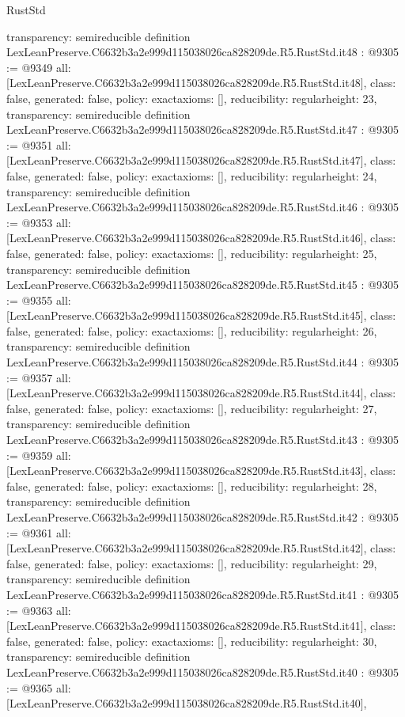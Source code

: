 \begin{lexlean}{RustStd}
\begin{coremodule}
{  transparency: semireducible
}
definition LexLeanPreserve.C6632b3a2e999d115038026ca828209de.R5.RustStd.it48 : @9305 := @9349 {
  all: [LexLeanPreserve.C6632b3a2e999d115038026ca828209de.R5.RustStd.it48],
  class: false,
  generated: false,
  policy: exact{axioms: []},
  reducibility: regular{height: 23},
  transparency: semireducible
}
definition LexLeanPreserve.C6632b3a2e999d115038026ca828209de.R5.RustStd.it47 : @9305 := @9351 {
  all: [LexLeanPreserve.C6632b3a2e999d115038026ca828209de.R5.RustStd.it47],
  class: false,
  generated: false,
  policy: exact{axioms: []},
  reducibility: regular{height: 24},
  transparency: semireducible
}
definition LexLeanPreserve.C6632b3a2e999d115038026ca828209de.R5.RustStd.it46 : @9305 := @9353 {
  all: [LexLeanPreserve.C6632b3a2e999d115038026ca828209de.R5.RustStd.it46],
  class: false,
  generated: false,
  policy: exact{axioms: []},
  reducibility: regular{height: 25},
  transparency: semireducible
}
definition LexLeanPreserve.C6632b3a2e999d115038026ca828209de.R5.RustStd.it45 : @9305 := @9355 {
  all: [LexLeanPreserve.C6632b3a2e999d115038026ca828209de.R5.RustStd.it45],
  class: false,
  generated: false,
  policy: exact{axioms: []},
  reducibility: regular{height: 26},
  transparency: semireducible
}
definition LexLeanPreserve.C6632b3a2e999d115038026ca828209de.R5.RustStd.it44 : @9305 := @9357 {
  all: [LexLeanPreserve.C6632b3a2e999d115038026ca828209de.R5.RustStd.it44],
  class: false,
  generated: false,
  policy: exact{axioms: []},
  reducibility: regular{height: 27},
  transparency: semireducible
}
definition LexLeanPreserve.C6632b3a2e999d115038026ca828209de.R5.RustStd.it43 : @9305 := @9359 {
  all: [LexLeanPreserve.C6632b3a2e999d115038026ca828209de.R5.RustStd.it43],
  class: false,
  generated: false,
  policy: exact{axioms: []},
  reducibility: regular{height: 28},
  transparency: semireducible
}
definition LexLeanPreserve.C6632b3a2e999d115038026ca828209de.R5.RustStd.it42 : @9305 := @9361 {
  all: [LexLeanPreserve.C6632b3a2e999d115038026ca828209de.R5.RustStd.it42],
  class: false,
  generated: false,
  policy: exact{axioms: []},
  reducibility: regular{height: 29},
  transparency: semireducible
}
definition LexLeanPreserve.C6632b3a2e999d115038026ca828209de.R5.RustStd.it41 : @9305 := @9363 {
  all: [LexLeanPreserve.C6632b3a2e999d115038026ca828209de.R5.RustStd.it41],
  class: false,
  generated: false,
  policy: exact{axioms: []},
  reducibility: regular{height: 30},
  transparency: semireducible
}
definition LexLeanPreserve.C6632b3a2e999d115038026ca828209de.R5.RustStd.it40 : @9305 := @9365 {
  all: [LexLeanPreserve.C6632b3a2e999d115038026ca828209de.R5.RustStd.it40],
}
\end{coremodule}
\end{lexlean}
